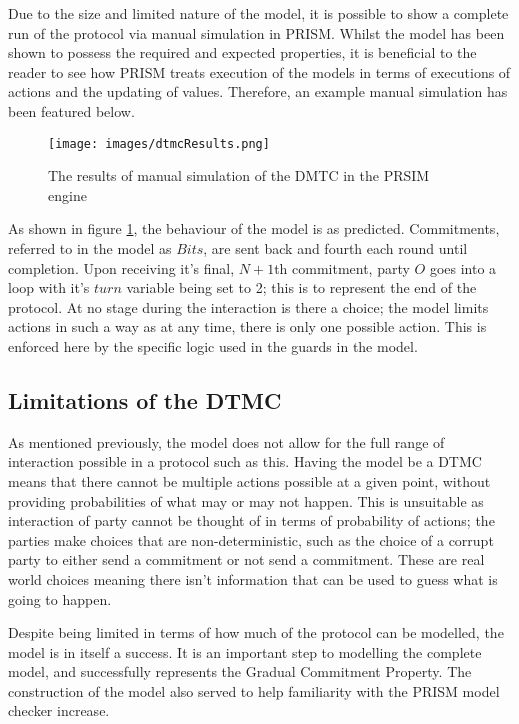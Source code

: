 \documentclass{l4proj}
\begin{document}
Due to the size and limited nature of the model, it is possible to show a complete run of the protocol via manual simulation in PRISM. Whilst the model has been shown to possess the required and expected properties, it is beneficial to the reader to see how PRISM treats execution of the models in terms of executions of actions and the updating of values. Therefore, an example manual simulation has been featured below.

\begin{figure}[ht!]
\centering
\texttt{[image: images/dtmcResults.png]}
\caption{The results of manual simulation of the DMTC in the PRSIM engine}
\label{dtmcEx}
\end{figure}

As shown in figure \ref{dtmcEx}, the behaviour of the model is as predicted. Commitments, referred to in the model as $Bits$, are sent back and fourth each round until completion. Upon receiving it's final, $N+1$th commitment, party $O$ goes into a loop with it's $turn$ variable being set to 2; this is to represent the end of the protocol. 
At no stage during the interaction is there a choice; the model limits actions in such a way as at any time, there is only one possible action. This is enforced here by the specific logic used in the guards in the model.

\subsection{Limitations of the DTMC}

As mentioned previously, the model does not allow for the full range of interaction possible in a protocol such as this. Having the model be a DTMC means that there cannot be multiple actions possible at a given point, without providing probabilities of what may or may not happen. This is unsuitable as interaction of party cannot be thought of in terms of probability of actions; the parties make choices that are non-deterministic, such as the choice of a corrupt party to either send a commitment or not send a commitment. These are real world choices meaning there isn't information that can be used to guess what is going to happen. 

Despite being limited in terms of how much of the protocol can be modelled, the model is in itself a success. It is an important step to modelling the complete model, and successfully represents the Gradual Commitment Property. The construction of the model also served to help familiarity with the PRISM model checker increase.
\end{document}
